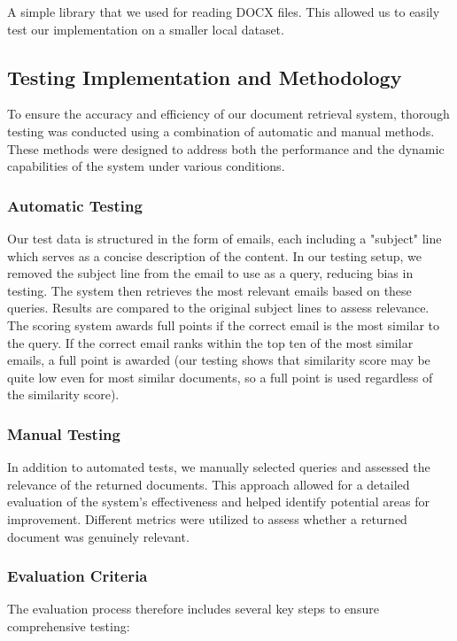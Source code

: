 \documentclass[12pt,a4paper]{article}
\begin{document}
        \noindent
        A simple library that we used for reading DOCX files. This allowed us to easily test our implementation on a smaller local dataset.

\subsection{Testing Implementation and Methodology}
To ensure the accuracy and efficiency of our document retrieval system, thorough testing was conducted using a combination of automatic and manual methods. These methods were designed to address both the performance and the dynamic capabilities of the system under various conditions.

\subsubsection{Automatic Testing}
\noindent
Our test data is structured in the form of emails, each including a "subject" line which serves as a concise description of the content. In our testing setup, we removed the subject line from the email to use as a query, reducing bias in testing. The system then retrieves the most relevant emails based on these queries. Results are compared to the original subject lines to assess relevance. The scoring system awards full points if the correct email is the most similar to the query. If the correct email ranks within the top ten of the most similar emails, a full point is awarded (our testing shows that similarity score may be quite low even for most similar documents, so a full point is used regardless of the similarity score).

\subsubsection{Manual Testing}
\noindent
In addition to automated tests, we manually selected queries and assessed the relevance of the returned documents. This approach allowed for a detailed evaluation of the system's effectiveness and helped identify potential areas for improvement. Different metrics were utilized to assess whether a returned document was genuinely relevant.

\subsubsection{Evaluation Criteria}
The evaluation process therefore includes several key steps to ensure comprehensive testing:
\end{document}
